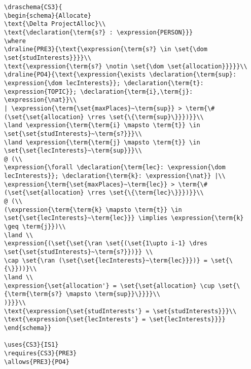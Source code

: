 \begin{verbatim}
\draschema{CS3}{
\begin{schema}{Allocate}
\text{\Delta ProjectAlloc}\\
\text{\declaration{\term{s?} : \expression{PERSON}}}
\where
\draline{PRE3}{\text{\expression{\term{s?} \in \set{\dom \set{studInterests}}}}\\
\text{\expression{\term{s?} \notin \set{\dom \set{allocation}}}}}\\
\draline{PO4}{\text{\expression{\exists \declaration{\term{sup}: \expression{\dom lecInterests}}; \declaration{\term{t}: \expression{TOPIC}}; \declaration{\term{i},\term{j}: \expression{\nat}}\\
| \expression{\term{\set{maxPlaces}~\term{sup}} > \term{\#(\set{\set{allocation} \rres \set{\{\term{sup}\}}})}}\\
\land \expression{\term{\term{i} \mapsto \term{t}} \in \set{\set{studInterests}~\term{s?}}}\\
\land \expression{\term{\term{j} \mapsto \term{t}} \in \set{\set{lecInterests}~\term{sup}}}\\
@ (\\
\expression{\forall \declaration{\term{lec}: \expression{\dom lecInterests}}; \declaration{\term{k}: \expression{\nat}} |\\ \expression{\term{\set{maxPlaces}~\term{lec}} > \term{\# (\set{\set{allocation} \rres \set{\{\term{lec}\}}})}}\\
@ (\\
(\expression{\term{\term{k} \mapsto \term{t}} \in \set{\set{lecInterests}~\term{lec}}} \implies \expression{\term{k} \geq \term{j}})\\
\land \\
\expression{(\set{\set{\ran \set{(\set{1\upto i-1} \dres \set{\set{studInterests}~\term{s?}})}} \\
\cap \set{\ran (\set{\set{lecInterests}~\term{lec}}})} = \set{\{\}}))}\\
\land \\
\expression{\set{allocation'} = \set{\set{allocation} \cup \set{\{\term{\term{s?} \mapsto \term{sup}}\}}}}\\
)}}}\\
\text{\expression{\set{studInterests'} = \set{studInterests}}}\\
\text{\expression{\set{lecInterests'} = \set{lecInterests}}}}
\end{schema}}

\uses{CS3}{IS1}
\requires{CS3}{PRE3}
\allows{PRE3}{PO4}


\end{verbatim}
